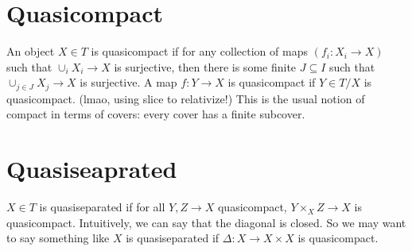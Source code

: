 \documentclass[11pt]{book}
\begin{document}
\section{Quasicompact}
An object $X \in T$ is quasicompact if for any collection of maps $(f_i: X_i \rightarrow X)$
such that $\cup_i X_i \rightarrow X$ is surjective, then there is some finite $J \subseteq I$
such that $\cup_{j \in J} X_j \rightarrow X$ is surjective. A map $f: Y \rightarrow X$ is quasicompact
if $Y \in T/X$ is quasicompact. (lmao, using slice to relativize!) This is the usual notion of
compact in terms of covers: every cover has a finite subcover.

\section{Quasiseaprated}

$X \in T$ is quasiseparated if for all $Y, Z \rightarrow X$ quasicompact, $Y \times_X Z \rightarrow X$
is quasicompact. Intuitively, we can say that the diagonal is closed. So we may want to say something
like $X$ is quasiseparated if $\Delta: X \rightarrow X \times X$ is quasicompact.
\end{document}
